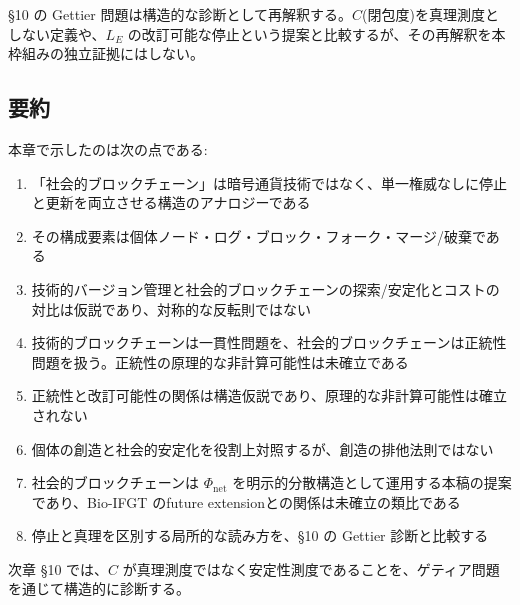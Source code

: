 \S{}10 の Gettier 問題は構造的な診断として再解釈する。$C$(閉包度)を真理測度としない定義や、$L_E$ の改訂可能な停止という提案と比較するが、その再解釈を本枠組みの独立証拠にはしない。

\bigskip


\subsection{要約}


本章で示したのは次の点である:

\begin{enumerate}
\item 「社会的ブロックチェーン」は暗号通貨技術ではなく、単一権威なしに停止と更新を両立させる構造のアナロジーである
\item その構成要素は個体ノード・ログ・ブロック・フォーク・マージ/破棄である
\item 技術的バージョン管理と社会的ブロックチェーンの探索/安定化とコストの対比は仮説であり、対称的な反転則ではない
\item 技術的ブロックチェーンは一貫性問題を、社会的ブロックチェーンは正統性問題を扱う。正統性の原理的な非計算可能性は未確立である
\item 正統性と改訂可能性の関係は構造仮説であり、原理的な非計算可能性は確立されない
\item 個体の創造と社会的安定化を役割上対照するが、創造の排他法則ではない
\item 社会的ブロックチェーンは $\Phi_{\text{net}}$ を明示的分散構造として運用する本稿の提案であり、Bio-IFGT のfuture extensionとの関係は未確立の類比である
\item 停止と真理を区別する局所的な読み方を、\S{}10 の Gettier 診断と比較する
\end{enumerate}


次章 \S{}10 では、$C$ が真理測度ではなく安定性測度であることを、ゲティア問題を通じて構造的に診断する。

\bigskip
